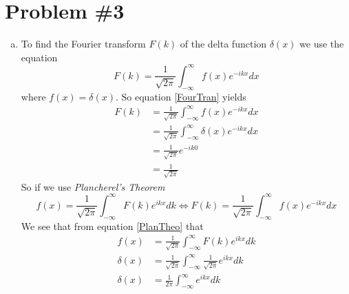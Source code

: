 \documentclass[11pt]{article}
\numberwithin{equation}{section}
\begin{document}
\section{Problem \#3}
\begin{enumerate}[(a)]
\item
To find the Fourier transform $F(k)$ of the delta function $\delta(x)$ we use the equation
\begin{equation}
F(k) = \frac{1}{\sqrt{2\pi}}\int_{-\infty}^{\infty}f(x)e^{-ikx}dx
\label{FourTran}
\end{equation}
where $f(x)=\delta(x)$. So equation \ref{FourTran} yields
\begin{align*}
F(k) &= \frac{1}{\sqrt{2\pi}}\int_{-\infty}^{\infty}f(x)e^{-ikx}dx\\
&= \frac{1}{\sqrt{2\pi}}\int_{-\infty}^{\infty}\delta(x)e^{-ikx}dx\\
&= \frac{1}{\sqrt{2\pi}}e^{-ik0}\\
&= \frac{1}{\sqrt{2\pi}}
\end{align*}
So if we use \emph{Plancherel's Theorem} 
\begin{equation}
f(x) = \frac{1}{\sqrt{2\pi}}\int_{-\infty}^{\infty}F(k)e^{ikx}dk\Longleftrightarrow F(k) = \frac{1}{\sqrt{2\pi}}\int_{-\infty}^{\infty}f(x)e^{-ikx}dx
\label{PlanTheo}
\end{equation}
We see that from equation \ref{PlanTheo} that
\begin{align*}
f(x) &= \frac{1}{\sqrt{2\pi}}\int_{-\infty}^{\infty}F(k)e^{ikx}dk\\
\delta(x) &= \frac{1}{\sqrt{2\pi}}\int_{-\infty}^{\infty}\frac{1}{\sqrt{2\pi}}e^{ikx}dk\\
\delta(x) &= \frac{1}{2\pi}\int_{-\infty}^{\infty}e^{ikx}dk
\end{align*}


\end{enumerate}
\end{document}
